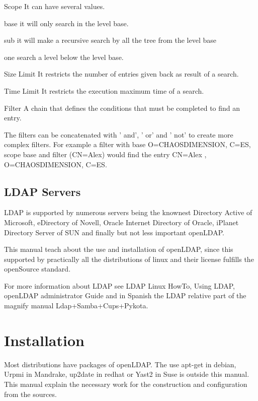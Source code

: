 \begin{itemize}
\begin{list}{}{}
\item[Scope]
It can have several values.
\begin{list}{}{}
\item[base] it will only search in the level base. 
\item[sub]  it will make a recursive search by all the tree from the level base 
\item[one] search a level below the level base.
\end{list}

\item[Size Limit]
It restricts the number of entries given back as result of a search.

\item[Time Limit]
It restricts the execution maximum time of a search.

\item[Filter]
A chain that defines the conditions that must be completed to find an entry.

\end{list}

The filters can be concatenated with ' and', ' or' and ' not' to create more complex filters. For example a filter with base O=CHAOSDIMENSION, C=ES, scope base and filter (CN=Alex) would find the entry CN=Alex , O=CHAOSDIMENSION, C=ES.

\end{itemize}
\newpage
\subsection{LDAP Servers}

LDAP is supported by numerous servers being the knownest Directory Active of Microsoft, eDirectory of Novell, Oracle Internet Directory of Oracle, iPlanet Directory Server of SUN and finally but not less important openLDAP.

This manual teach about the use and installation of openLDAP, since this supported by practically all the distributions of linux and their license fulfills the openSource standard. 

For more information about LDAP see LDAP Linux HowTo\cite{llh}, Using LDAP\cite{ul}, openLDAP administrator Guide\cite{oag} and in Spanish the LDAP relative part of the magnify manual Ldap+Samba+Cups+Pykota\cite{lscp}. 

\section{Installation}
Most distributions have packages of openLDAP. The use apt-get in debian, Urpmi in Mandrake, up2date in redhat or Yast2 in Suse is outside this manual. This manual explain the necessary work for the construction and configuration from the sources.

